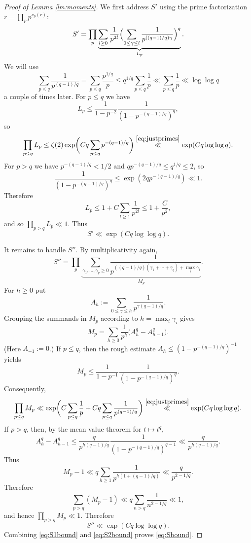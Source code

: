 \begin{proof}[Proof of Lemma \ref{lm:moments}]
We first address $S'$ using the prime factorization $r=\prod_p p^{\nu_p(r)}$:
\[ S' = \prod_p \underbrace{\sum_{l\geq0}
\frac{1}{p^{2l}} \Bigl( \sum_{0\leq \gamma\leq l} \frac{1}{p^{((q-1)/q)\gamma}} \Bigr)^q}_{L_p} . \]
We will use 
\begin{equation}\label{eq:justprimes}
\sum_{p\leq q} \frac1{p^{(q-1)/q}}
= \sum_{p\leq q} \frac{p^{1/q}}{p}
\leq q^{1/q} \sum_{p\leq q} \frac{1}{p}
\ll \sum_{p\leq q} \frac1p
\ll \log\log q
\end{equation}
a couple of times later.
For $p\leq q$ we have
\[ L_p\leq \frac1{1-p^{-2}}\frac1{(1-p^{-(q-1)/q})^q}, \]
so
\[ \prod_{p\leq q} L_p
\leq \zeta(2)\exp\biggl(Cq\sum_{p\leq q}p^{-(q-1)/q}\biggr)
\stackrel{\eqref{eq:justprimes}}{\ll} \exp(Cq\log\log q). \]
For $p>q$ we have $p^{-(q-1)/q}<1/2$ and $qp^{-(q-1)/q}\leq q^{1/q}\leq2$, so
\[ \frac{1}{(1-p^{-(q-1)/q})^q} \leq \exp(2qp^{-(q-1)/q}) \ll 1. \]
Therefore
\[ L_p\leq 1 + C\sum_{l\geq1} \frac{1}{p^{2l}} \leq 1+\frac{C}{p^2}, \]
and so $\prod_{p>q}L_p \ll 1$. Thus
\begin{equation}\label{eq:S1bound}
S'\ll \exp(Cq\log\log q).
\end{equation}

It remains to handle $S''$. By multiplicativity again,
\[ S''=\prod_p \underbrace{\sum_{\gamma_1,\ldots,\gamma_q\geq0}
\frac1{p^{((q-1)/q)(\gamma_1+\cdots+\gamma_q)+\max_i\gamma_i}}}_{M_p} . \]
For $h\geq0$ put
\[ A_h := \sum_{0\leq\gamma\leq h} \frac{1}{p^{\gamma(q-1)/q}}. \]
Grouping the summands in $M_p$ according to $h=\max_i\gamma_i$ gives
\[ M_p = \sum_{h\geq0} \frac{1}{p^h} \bigl(A_h^q-A_{h-1}^q\bigr). \]
(Here $A_{-1}:=0$.)
If $p\leq q$, then the rough estimate $A_h\leq(1-p^{-(q-1)/q})^{-1}$ yields
\[ M_p\leq \frac1{1-p^{-1}}\frac1{(1-p^{-(q-1)/q})^q}. \]
Consequently,
\[ \prod_{p\leq q}M_p
\ll \exp\biggl(C\sum_{p\leq q}\frac{1}{p} + C q\sum_{p\leq q} \frac{1}{p^{(q-1)/q}} \biggr)
\stackrel{\eqref{eq:justprimes}}{\ll} \exp(Cq\log\log q). \]
If $p>q$, then, by the mean value theorem for $t\mapsto t^q$,
\[ A_h^q-A_{h-1}^q
\leq \frac{q}{p^{h(q-1)/q}} \frac{1}{(1-p^{-(q-1)/q})^{q-1}}
\ll \frac{q}{p^{h(q-1)/q}}. \]
Thus
\[ M_p-1 \ll q\sum_{h\geq1} \frac{1}{p^{h(1+(q-1)/q)}}
\ll \frac{q}{p^{2-1/q}}. \]
Therefore
\[ \sum_{p>q} (M_p-1) \ll q \sum_{n>q} \frac{1}{n^{2-1/q}} \ll 1, \]
and hence $\prod_{p>q}M_p\ll1$. Therefore
\begin{equation}\label{eq:S2bound}
S''\ll \exp(Cq\log\log q).
\end{equation}
Combining \eqref{eq:S1bound} and \eqref{eq:S2bound} proves \eqref{eq:Sbound}.
\end{proof}

